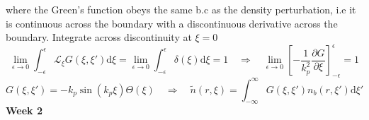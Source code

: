 \documentclass[%
onecolumn, notitlepage,
 amsmath,amssymb,
 aps,
]{article}
\begin{document}
where the Green's function obeys the same b.c as the density perturbation, i.e it is continuous across the boundary with a discontinuous derivative across the boundary.
Integrate across discontinuity at $\xi=0$
\begin{equation}
\lim_{\epsilon\to 0}\int_{-\epsilon}^{\epsilon} \mathcal{L}_{\xi}G\left(\xi,\xi'\right)\mathrm{d}\xi=\lim_{\epsilon\to 0}\int_{-\epsilon}^{\epsilon}\delta\left(\xi\right)\mathrm{d}\xi=1 \quad \Rightarrow \quad \lim_{\epsilon\to 0}\left[-\frac{1}{k_p^2}\frac{\partial G}{\partial \xi}\right]^{\epsilon}_{-\epsilon}=1
\end{equation}
\begin{equation}
G\left(\xi,\xi'\right)=-k_p\sin\left(k_p\xi \right)\Theta\left(\xi \right) \quad \Rightarrow \quad \tilde{n}\left(r,\xi \right)=\int_{-\infty}^{\infty}G\left(\xi,\xi'\right)n_b\left(r,\xi' \right) \mathrm{d}\xi'
\end{equation}
\noindent \textbf{Week 2}\\
\end{document}
